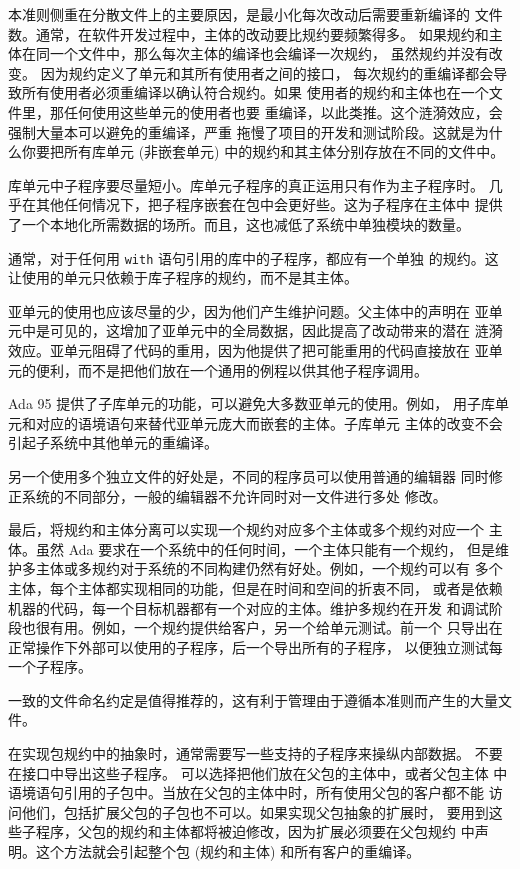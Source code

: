 \begin{blockindent}
本准则侧重在分散文件上的主要原因，是最小化每次改动后需要重新编译的
文件数。通常，在软件开发过程中，主体的改动要比规约要频繁得多。
如果规约和主体在同一个文件中，那么每次主体的编译也会编译一次规约，
虽然规约并没有改变。 因为规约定义了单元和其所有使用者之间的接口，
每次规约的重编译都会导致所有使用者必须重编译以确认符合规约。如果
使用者的规约和主体也在一个文件里，那任何使用这些单元的使用者也要
重编译，以此类推。这个涟漪效应，会强制大量本可以避免的重编译，严重
拖慢了项目的开发和测试阶段。这就是为什么你要把所有库单元 (非嵌套单元)
中的规约和其主体分别存放在不同的文件中。

库单元中子程序要尽量短小。库单元子程序的真正运用只有作为主子程序时。
几乎在其他任何情况下，把子程序嵌套在包中会更好些。这为子程序在主体中
提供了一个本地化所需数据的场所。而且，这也减低了系统中单独模块的数量。

通常，对于任何用 \texttt{with} 语句引用的库中的子程序，都应有一个单独
的规约。这让使用的单元只依赖于库子程序的规约，而不是其主体。

亚单元的使用也应该尽量的少，因为他们产生维护问题。父主体中的声明在
亚单元中是可见的，这增加了亚单元中的全局数据，因此提高了改动带来的潜在
涟漪效应。亚单元阻碍了代码的重用，因为他提供了把可能重用的代码直接放在
亚单元的便利，而不是把他们放在一个通用的例程以供其他子程序调用。

Ada 95 提供了子库单元的功能，可以避免大多数亚单元的使用。例如，
用子库单元和对应的语境语句来替代亚单元庞大而嵌套的主体。子库单元
主体的改变不会引起子系统中其他单元的重编译。

另一个使用多个独立文件的好处是，不同的程序员可以使用普通的编辑器
同时修正系统的不同部分，一般的编辑器不允许同时对一文件进行多处
修改。

最后，将规约和主体分离可以实现一个规约对应多个主体或多个规约对应一个
主体。虽然 Ada 要求在一个系统中的任何时间，一个主体只能有一个规约，
但是维护多主体或多规约对于系统的不同构建仍然有好处。例如，一个规约可以有
多个主体，每个主体都实现相同的功能，但是在时间和空间的折衷不同，
或者是依赖机器的代码，每一个目标机器都有一个对应的主体。维护多规约在开发
和调试阶段也很有用。例如，一个规约提供给客户，另一个给单元测试。前一个
只导出在正常操作下外部可以使用的子程序，后一个导出所有的子程序，
以便独立测试每一个子程序。

一致的文件命名约定是值得推荐的，这有利于管理由于遵循本准则而产生的大量文件。

在实现包规约中的抽象时，通常需要写一些支持的子程序来操纵内部数据。
不要在接口中导出这些子程序。 可以选择把他们放在父包的主体中，或者父包主体
中语境语句引用的子包中。当放在父包的主体中时，所有使用父包的客户都不能
访问他们，包括扩展父包的子包也不可以。如果实现父包抽象的扩展时，
要用到这些子程序，父包的规约和主体都将被迫修改，因为扩展必须要在父包规约
中声明。这个方法就会引起整个包 (规约和主体) 和所有客户的重编译。


\end{blockindent}
